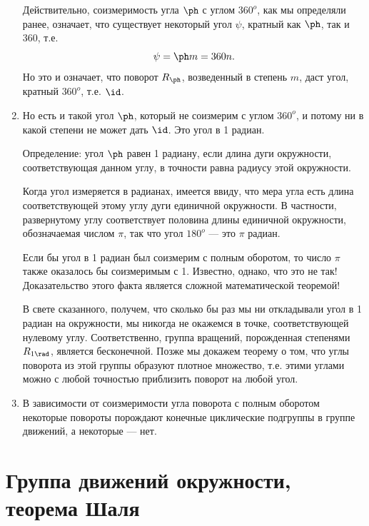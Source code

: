 \begin{enumerate}
Действительно, соизмеримость угла $\ph$ с углом $360^o$, как мы определяли ранее, означает, что существует некоторый угол $\psi$, кратный как $\ph$, так и $360$, т.е.
$$
\psi = \ph m = 360n.
$$
Но это и означает, что поворот $R_\ph$, возведенный в степень $m$, даст угол, кратный $360^o$, т.е. $\id$.

\item Но есть и такой угол $\ph$, который не соизмерим с углом $360^o$, и потому ни в какой степени не может дать $\id$. Это угол в 1 радиан.

Определение: угол $\ph$ равен 1 радиану, если длина дуги окружности, соответствующая данном углу, в точности равна радиусу этой окружности.

Когда угол измеряется в радианах, имеется ввиду, что мера угла есть длина соответствующей этому углу дуги единичной окружности. В частности, развернутому углу соответствует половина длины единичной окружности, обозначаемая числом $\pi$, так что угол $180^o$ --- это $\pi$ радиан.

Если бы угол в 1 радиан был соизмерим с полным оборотом, то число $\pi$ также оказалось бы соизмеримым с 1. Известно, однако, что это не так! Доказательство этого факта является сложной математической теоремой!

В свете сказанного, получем, что сколько бы раз мы ни откладывали угол в 1 радиан на окружности, мы никогда не окажемся в точке, соответствующей нулевому углу. Соответственно, группа вращений, порожденная степенями $R_{1\rad}$, является бесконечной. Позже мы докажем теорему о том, что углы поворота из этой группы образуют плотное множество, т.е. этими углами можно с любой точностью приблизить поворот на любой угол.

\item В зависимости от соизмеримости угла поворота с полным оборотом некоторые повороты порождают конечные циклические подгруппы в группе движений, а некоторые --- нет.
\end{enumerate}


\section{Группа движений окружности, теорема Шаля}\label{CircleGroup}


